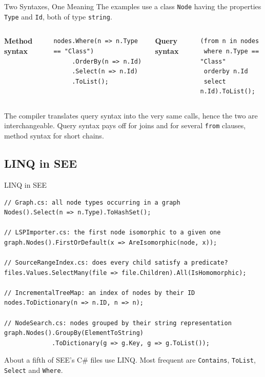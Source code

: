\begin{frame}[fragile]{Two Syntaxes, One Meaning}
  The examples use a class \texttt{Node} having the properties \texttt{Type} and
  \texttt{Id}, both of type \texttt{string}.
  \vspace{1ex}

  \begin{columns}[T]
      \textbf{Method syntax}
      \begin{lstlisting}[basicstyle=\scriptsize\ttfamily]
nodes.Where(n => n.Type == "Class")
     .OrderBy(n => n.Id)
     .Select(n => n.Id)
     .ToList();
      \end{lstlisting}
      \textbf{Query syntax}
      \begin{lstlisting}[basicstyle=\scriptsize\ttfamily]
(from n in nodes
 where n.Type == "Class"
 orderby n.Id
 select n.Id).ToList();
      \end{lstlisting}
  \end{columns}
  \vspace{1ex}

  The compiler translates query syntax into the very same calls, hence the two
  are interchangeable. Query syntax pays off for joins and for several
  \texttt{from} clauses, method syntax for short chains.
  \vspace{4ex}

\end{frame}

\subsection{LINQ in SEE}

\begin{frame}[fragile]{LINQ in SEE}
  \begin{lstlisting}[basicstyle=\scriptsize\ttfamily]
// Graph.cs: all node types occurring in a graph
Nodes().Select(n => n.Type).ToHashSet();

// LSPImporter.cs: the first node isomorphic to a given one
graph.Nodes().FirstOrDefault(x => AreIsomorphic(node, x));

// SourceRangeIndex.cs: does every child satisfy a predicate?
files.Values.SelectMany(file => file.Children).All(IsHomomorphic);

// IncrementalTreeMap: an index of nodes by their ID
nodes.ToDictionary(n => n.ID, n => n);

// NodeSearch.cs: nodes grouped by their string representation
graph.Nodes().GroupBy(ElementToString)
             .ToDictionary(g => g.Key, g => g.ToList());
  \end{lstlisting}
  \vspace{1ex}

  About a fifth of SEE's C\# files use LINQ. Most frequent are
  \texttt{Contains}, \texttt{ToList}, \texttt{Select} and \texttt{Where}.
\end{frame}


